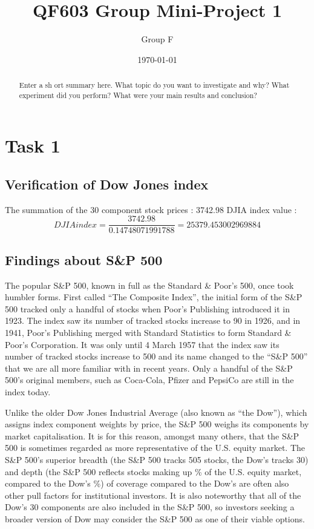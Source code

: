 \documentclass[a4paper]{article}
\title{QF603 Group Mini-Project 1}
\author{Group F}
\date{\today}
\begin{document}
\maketitle

\begin{abstract}
Enter a sh ort summary here. What topic do you want to investigate and why? What experiment did you perform? What were your main results and conclusion?
\end{abstract} 

\section{Task 1}
\label{sec:introduction}

\subsection{Verification of Dow Jones index}
\begin{flushleft}
The summation of the 30 component stock prices : 3742.98 \linebreak 
DJIA index value :
$$ DJIA index = \frac{3742.98}{0.14748071991788} = 25379.453002969884
$$
\end{flushleft}

\subsection{Findings about S\&P 500}
The popular S\&P 500, known in full as the Standard \& Poor’s 500, once took humbler forms. First called “The Composite Index”, the initial form of the S\&P 500 tracked only a handful of stocks when Poor’s Publishing introduced it in 1923. The index saw its number of tracked stocks increase to 90 in 1926, and in 1941, Poor’s Publishing merged with Standard Statistics to form Standard \& Poor’s Corporation. It was only until 4 March 1957 that the index saw its number of tracked stocks increase to 500 and its name changed to the “S\&P 500” that we are all more familiar with in recent years. Only a handful of the S\&P 500’s original members, such as Coca-Cola, Pfizer and PepsiCo are still in the index today.

Unlike the older Dow Jones Industrial Average (also known as “the Dow”), which assigns index component weights by price, the S\&P 500 weighs its components by market capitalisation. It is for this reason, amongst many others, that the S\&P 500 is sometimes regarded as more representative of the U.S. equity market. The S\&P 500’s superior breadth (the S\&P 500 tracks 505 stocks, the Dow’s tracks 30) and depth (the S\&P 500 reflects stocks making up \% of the U.S. equity market, compared to the Dow’s \%) of coverage compared to the Dow’s are often also other pull factors for institutional investors. It is also noteworthy that all of the Dow’s 30 components are also included in the S\&P 500, so investors seeking a broader version of Dow may consider the S\&P 500 as one of their viable options.
\end{document}
